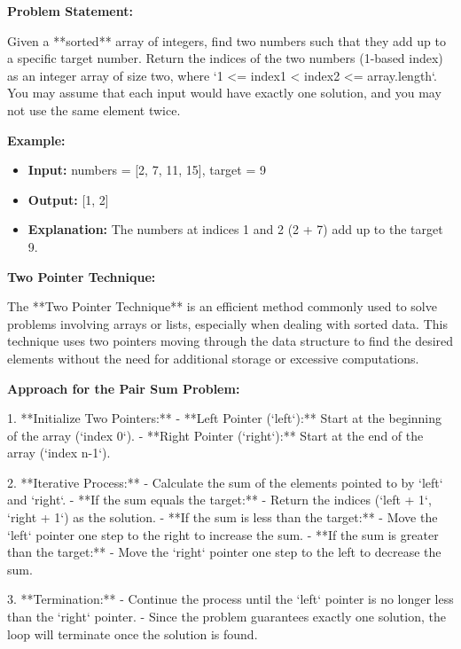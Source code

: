 

\textbf{Problem Statement:}

Given a **sorted** array of integers, find two numbers such that they add up to a specific target number. Return the indices of the two numbers (1-based index) as an integer array of size two, where `1 <= index1 < index2 <= array.length`. You may assume that each input would have exactly one solution, and you may not use the same element twice.

\textbf{Example:}

\begin{itemize}
    \item \textbf{Input:} numbers = [2, 7, 11, 15], target = 9
    \item \textbf{Output:} [1, 2]
    \item \textbf{Explanation:} The numbers at indices 1 and 2 (2 + 7) add up to the target 9.
\end{itemize}

\textbf{Two Pointer Technique:}

The **Two Pointer Technique** is an efficient method commonly used to solve problems involving arrays or lists, especially when dealing with sorted data. This technique uses two pointers moving through the data structure to find the desired elements without the need for additional storage or excessive computations.

\textbf{Approach for the Pair Sum Problem:}

1. **Initialize Two Pointers:**
   - **Left Pointer (`left`):** Start at the beginning of the array (`index 0`).
   - **Right Pointer (`right`):** Start at the end of the array (`index n-1`).

2. **Iterative Process:**
   - Calculate the sum of the elements pointed to by `left` and `right`.
   - **If the sum equals the target:**
     - Return the indices (`left + 1`, `right + 1`) as the solution.
   - **If the sum is less than the target:**
     - Move the `left` pointer one step to the right to increase the sum.
   - **If the sum is greater than the target:**
     - Move the `right` pointer one step to the left to decrease the sum.

3. **Termination:**
   - Continue the process until the `left` pointer is no longer less than the `right` pointer.
   - Since the problem guarantees exactly one solution, the loop will terminate once the solution is found.

